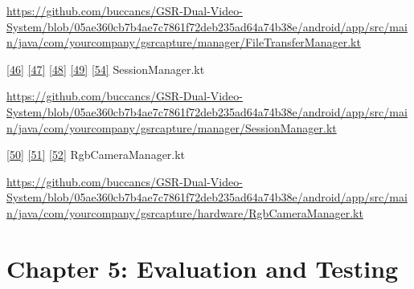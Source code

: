\documentclass[12pt,a4paper]{article}
\begin{document}
\url{https://github.com/buccancs/GSR-Dual-Video-System/blob/05ae360cb7b4ae7c7861f72deb235ad64a74b38e/android/app/src/main/java/com/yourcompany/gsrcapture/manager/FileTransferManager.kt}

\href{https://github.com/buccancs/GSR-Dual-Video-System/blob/05ae360cb7b4ae7c7861f72deb235ad64a74b38e/android/app/src/main/java/com/yourcompany/gsrcapture/manager/SessionManager.kt\#L14-L22}{{[}46{]}} \href{https://github.com/buccancs/GSR-Dual-Video-System/blob/05ae360cb7b4ae7c7861f72deb235ad64a74b38e/android/app/src/main/java/com/yourcompany/gsrcapture/manager/SessionManager.kt\#L22-L30}{{[}47{]}} \href{https://github.com/buccancs/GSR-Dual-Video-System/blob/05ae360cb7b4ae7c7861f72deb235ad64a74b38e/android/app/src/main/java/com/yourcompany/gsrcapture/manager/SessionManager.kt\#L32-L40}{{[}48{]}} \href{https://github.com/buccancs/GSR-Dual-Video-System/blob/05ae360cb7b4ae7c7861f72deb235ad64a74b38e/android/app/src/main/java/com/yourcompany/gsrcapture/manager/SessionManager.kt\#L26-L34}{{[}49{]}} \href{https://github.com/buccancs/GSR-Dual-Video-System/blob/05ae360cb7b4ae7c7861f72deb235ad64a74b38e/android/app/src/main/java/com/yourcompany/gsrcapture/manager/SessionManager.kt\#L40-L47}{{[}54{]}} SessionManager.kt

\url{https://github.com/buccancs/GSR-Dual-Video-System/blob/05ae360cb7b4ae7c7861f72deb235ad64a74b38e/android/app/src/main/java/com/yourcompany/gsrcapture/manager/SessionManager.kt}

\href{https://github.com/buccancs/GSR-Dual-Video-System/blob/05ae360cb7b4ae7c7861f72deb235ad64a74b38e/android/app/src/main/java/com/yourcompany/gsrcapture/hardware/RgbCameraManager.kt\#L111-L119}{{[}50{]}} \href{https://github.com/buccancs/GSR-Dual-Video-System/blob/05ae360cb7b4ae7c7861f72deb235ad64a74b38e/android/app/src/main/java/com/yourcompany/gsrcapture/hardware/RgbCameraManager.kt\#L70-L78}{{[}51{]}} \href{https://github.com/buccancs/GSR-Dual-Video-System/blob/05ae360cb7b4ae7c7861f72deb235ad64a74b38e/android/app/src/main/java/com/yourcompany/gsrcapture/hardware/RgbCameraManager.kt\#L86-L95}{{[}52{]}} RgbCameraManager.kt

\url{https://github.com/buccancs/GSR-Dual-Video-System/blob/05ae360cb7b4ae7c7861f72deb235ad64a74b38e/android/app/src/main/java/com/yourcompany/gsrcapture/hardware/RgbCameraManager.kt}

\newpage

\section{Chapter 5: Evaluation and Testing}\label{chapter-5-evaluation-and-testing}
\end{document}

